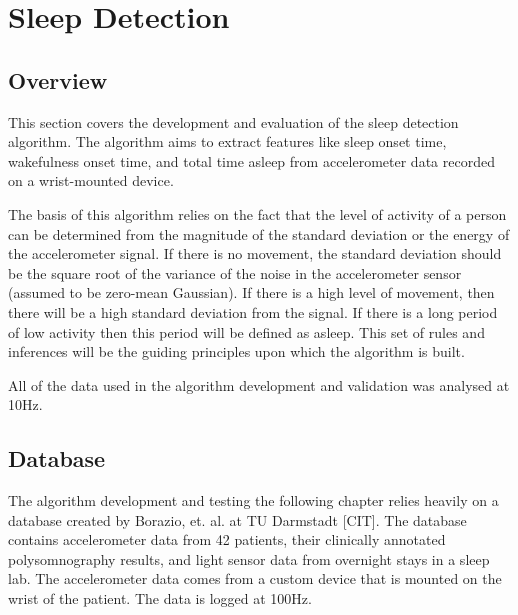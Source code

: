 \part{Sleep Detection}

    \chapter{Overview}

        This section covers the development and evaluation of the sleep detection algorithm. The algorithm aims to extract features like sleep onset time, wakefulness onset time, and total time asleep from accelerometer data recorded on a wrist-mounted device.

        The basis of this algorithm relies on the fact that the level of activity of a person can be determined from the magnitude of the standard deviation or the energy of the accelerometer signal. If there is no movement, the standard deviation should be the square root of the variance of the noise in the accelerometer sensor (assumed to be zero-mean Gaussian). If there is a high level of movement, then there will be a high standard deviation from the signal. If there is a long period of low activity then this period will be defined as asleep. This set of rules and inferences will be the guiding principles upon which the algorithm is built.

        All of the data used in the algorithm development and validation was analysed at 10Hz.


    \chapter{Database}
        \label{c-database}

        The algorithm development and testing the following chapter relies heavily on a database created by Borazio, et. al. at TU Darmstadt [CIT]. The database contains accelerometer data from 42 patients, their clinically annotated polysomnography results, and light sensor data from overnight stays in a sleep lab. The accelerometer data comes from a custom device that is mounted on the wrist of the patient. The data is logged at 100Hz. 

